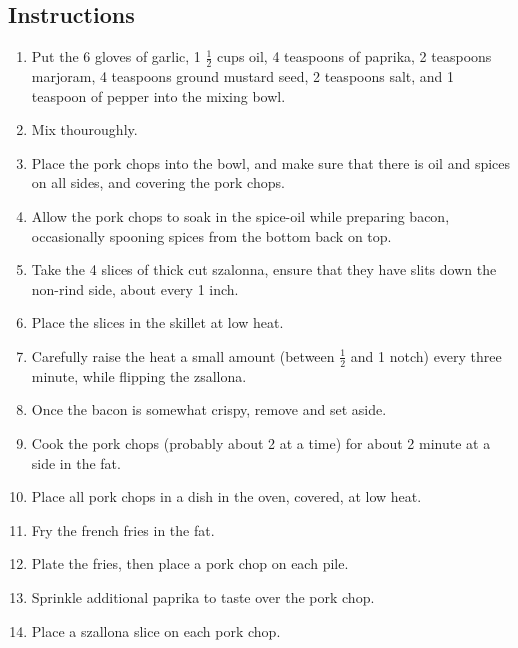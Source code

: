 \begin{multicols}{2}
\subsection*{Instructions}
\begin{enumerate}
    \item Put the 6 gloves of garlic, 1 \( \frac{1}{2} \) cups oil, 4 teaspoons of paprika, 2 teaspoons marjoram, 4 teaspoons ground mustard seed, 2 teaspoons salt, and 1 teaspoon of pepper into the mixing bowl.
    \item Mix thouroughly.
    \item Place the pork chops into the bowl, and make sure that there is oil and spices on all sides, and covering the pork chops.
    \item Allow the pork chops to soak in the spice-oil while preparing bacon, occasionally spooning spices from the bottom back on top.
    \item Take the 4 slices of thick cut szalonna, ensure that they have slits down the non-rind side, about every 1 inch.
    \item Place the slices in the skillet at low heat.
    \item Carefully raise the heat a small amount (between \( \frac{1}{2} \) and 1 notch) every three minute, while flipping the zsallona.
    \item Once the bacon is somewhat crispy, remove and set aside.
    \item Cook the pork chops (probably about 2 at a time) for about 2 minute at a side in the fat.
    \item Place all pork chops in a dish in the oven, covered, at low heat.
    \item Fry the french fries in the fat.
    \item Plate the fries, then place a pork chop on each pile.
    \item Sprinkle additional paprika to taste over the pork chop.
    \item Place a szallona slice on each pork chop.

\end{enumerate}


\end{multicols}
